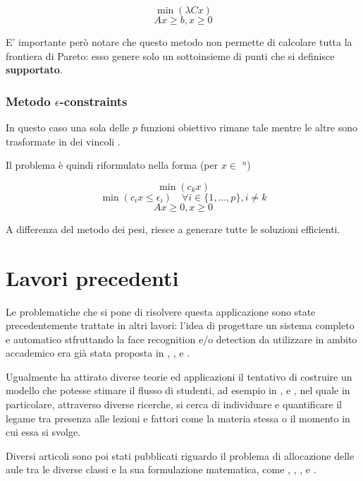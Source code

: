 \begin{equation*}
    \min (\lambda Cx)    
    \label{eq:}
\end{equation*}
\begin{equation*}
    Ax \geq b, x\geq 0
    \label{eq:}
\end{equation*}

E' importante però notare che questo metodo non permette di calcolare tutta la frontiera di Pareto:
esso genere solo un sottoinsieme di punti che si definisce \textbf{supportato}. 

\subsubsection{Metodo $\epsilon$-constraints}
\label{section:epsilon_constraints}

In questo caso una sola delle $p$ funzioni obiettivo rimane tale mentre le altre sono trasformate in 
dei vincoli \cite{Figueira2006}.

Il problema è quindi riformulato nella forma (per $x \in$ \Zset$^n$)

\begin{equation*}
    \min (c_kx)    
    \label{eq:}
\end{equation*}
\begin{equation*}
    \min (c_ix \leq \epsilon_i)  \quad \forall i \in \{1, \dots, p\}, i \neq k   
    \label{eq:}
\end{equation*}
\begin{equation*}
    Ax \geq 0, x \geq 0
    \label{eq:}
\end{equation*}

A differenza del metodo dei pesi, riesce a generare tutte le soluzioni efficienti.

\newpage

\section{Lavori precedenti}
\label{section:past_works}

Le problematiche che si pone di risolvere questa applicazione sono state 
precedentemente trattate in altri lavori: l'idea di progettare un sistema 
completo e automatico stfruttando la face recognition e/o detection
da utilizzare in ambito accademico era già stata proposta in ,
,  e .

Ugualmente ha attirato diverse teorie ed applicazioni il tentativo di costruire
un modello che potesse stimare il flusso di studenti, ad esempio in ,
 e , nel quale in particolare, attraverso 
diverse ricerche, si cerca di individuare e quantificare il legame tra presenza alle 
lezioni e fattori come la materia stessa o il momento in cui essa si svolge.

Diversi articoli sono poi stati pubblicati riguardo il problema di allocazione delle aule
tra le diverse classi e la sua formulazione matematica, come , 
, ,  e
.
